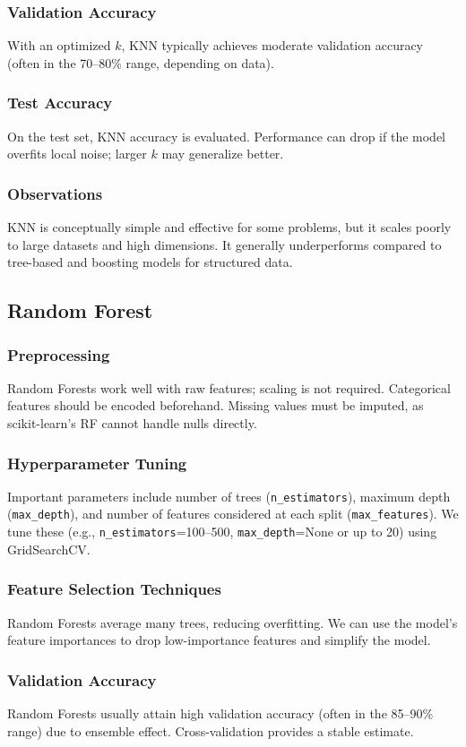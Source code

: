 \documentclass[12pt]{article}
\begin{document}
\subsubsection{Validation Accuracy}
With an optimized $k$, KNN typically achieves moderate validation accuracy (often in the 70--80\% range, depending on data).
\subsubsection{Test Accuracy}
On the test set, KNN accuracy is evaluated. Performance can drop if the model overfits local noise; larger $k$ may generalize better.
\subsubsection{Observations}
KNN is conceptually simple and effective for some problems, but it scales poorly to large datasets and high dimensions. It generally underperforms compared to tree-based and boosting models for structured data.

\subsection{Random Forest}
\subsubsection{Preprocessing}
Random Forests work well with raw features; scaling is not required. Categorical features should be encoded beforehand. Missing values must be imputed, as scikit-learn's RF cannot handle nulls directly.
\subsubsection{Hyperparameter Tuning}
Important parameters include number of trees (\texttt{n\_estimators}), maximum depth (\texttt{max\_depth}), and number of features considered at each split (\texttt{max\_features}). We tune these (e.g., \texttt{n\_estimators}=100--500, \texttt{max\_depth}=None or up to 20) using GridSearchCV.
\subsubsection{Feature Selection Techniques}
Random Forests average many trees, reducing overfitting. We can use the model's feature importances to drop low-importance features and simplify the model.
\subsubsection{Validation Accuracy}
Random Forests usually attain high validation accuracy (often in the 85--90\% range) due to ensemble effect. Cross-validation provides a stable estimate.
\end{document}
